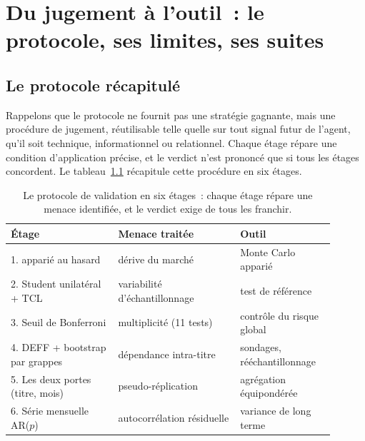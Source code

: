 \chapter{Du jugement à l'outil~: le protocole, ses limites, ses suites}
\label{chap:protocole}

\section{Le protocole récapitulé}
\label{sec:protocole}

Rappelons que le protocole ne fournit pas une stratégie gagnante, mais une
procédure de jugement, réutilisable telle quelle sur tout signal futur de
l'agent, qu'il soit technique, informationnel ou relationnel. Chaque étage
répare une condition d'application précise, et le verdict n'est prononcé que
si tous les étages concordent. Le tableau~\ref{tab:protocole} récapitule cette
procédure en six étages.

\begin{table}[H]
\centering
\caption{Le protocole de validation en six étages~: chaque étage répare
une menace identifiée, et le verdict exige de tous les franchir.}
\label{tab:protocole}
\small
\begin{tabular}{@{}p{0.30\linewidth}p{0.34\linewidth}p{0.26\linewidth}@{}}
\toprule
Étage & Menace traitée & Outil \\
\midrule
1. \edgevar{} apparié au hasard & dérive du marché & Monte Carlo apparié \\
2. Student unilatéral + TCL & variabilité d'échantillonnage & test de référence \\
3. Seuil de Bonferroni & multiplicité (11 tests) & contrôle du risque global \\
4. DEFF + bootstrap par grappes & dépendance intra-titre & sondages, rééchantillonnage \\
5. Les deux portes (titre, mois) & pseudo-réplication & agrégation équipondérée \\
6. Série mensuelle AR($p$) & autocorrélation résiduelle & variance de long terme \\
\bottomrule
\end{tabular}
\end{table}


